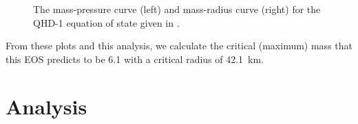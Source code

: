 \begin{figure}[h!]
\begin{subfigure}{.5\textwidth}
    \end{subfigure}
    \caption{The mass-pressure curve (left) and mass-radius curve (right) for the QHD-1 equation of state given in \autocite{diener_2008}.}
    \label{fig: qhd1 mass radius pressure}
\end{figure}

From these plots and this analysis, we calculate the critical (maximum) mass that this EOS predicts to be \SI{6.1}{\odot} with a critical radius of \SI{42.1}{km}.

\section{Analysis}

